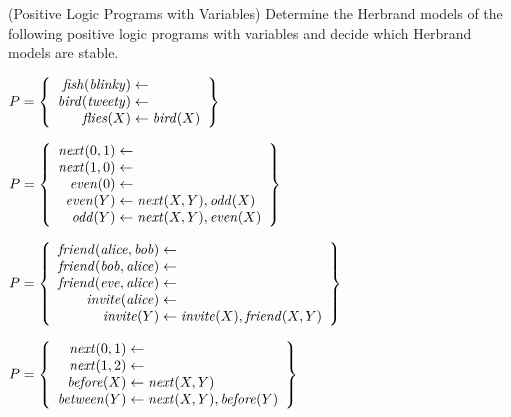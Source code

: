 \begin{Uebung}{(Positive Logic Programs with Variables)}%
Determine the Herbrand models of the following positive logic programs with variables
and decide which Herbrand models are stable.

\begin{UList}
\item
\(
P =
\left\{
\begin{array}{r@{{}\leftarrow{}}l}
    \mathit{fish}(\mathit{blinky})        \\
    \mathit{bird}(\mathit{tweety})      \\
    \mathit{flies}(X) & \mathit{bird}(X) %
\end{array}
\right\}
\)
\item 
\(
P =
\left\{
\begin{array}{r@{{}\leftarrow{}}l}
    \mathit{next}(0,1) \\
    \mathit{next}(1,0) \\
    \mathit{even}(0)  \\
    \mathit{even}(Y) & \mathit{next}(X,Y), \mathit{odd}(X)  \\
    \mathit{odd}(Y)  & \mathit{next}(X,Y), \mathit{even}(X)
\end{array}
\right\}
\)
\item
\(
P =
\left\{
\begin{array}{r@{{}\leftarrow{}}l}
    \mathit{friend}(\mathit{alice},\mathit{bob})  \\
    \mathit{friend}(\mathit{bob},\mathit{alice})  \\
    \mathit{friend}(\mathit{eve},\mathit{alice})  \\
    \mathit{invite}(\mathit{alice})  \\
    \mathit{invite}(Y) & \mathit{invite}(X), \mathit{friend}(X,Y)
\end{array}
\right\}
\)
\item
\(
P =
\left\{
\begin{array}{r@{{}\leftarrow{}}l}
    \mathit{next}(0,1) \\
    \mathit{next}(1,2) \\
    \mathit{before}(X)   & \mathit{next}(X,Y) \\
    \mathit{between}(Y)  & \mathit{next}(X,Y), \mathit{before}(Y)
\end{array}
\right\}
\)
\end{UList}
\end{Uebung}

